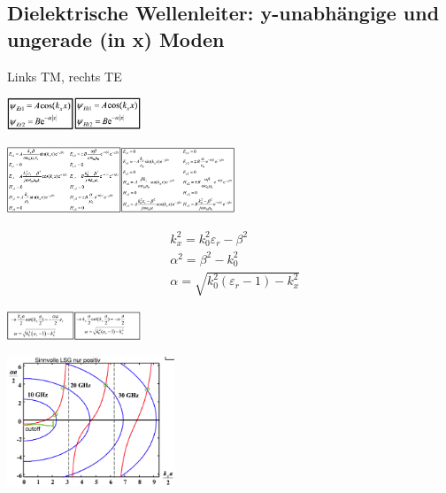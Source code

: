 \documentclass[english]{latex4ei/latex4ei_sheet}
\begin{document}
\begin{sectionbox}
	\subsection{Dielektrische Wellenleiter: y-unabhängige und ungerade (in x) Moden}
	Links TM, rechts TE\\
	\begin{center}\includegraphics[width = 2cm]{./img/dielektr-ugtm.png}\includegraphics[width = 2cm]{./img/dielektr-ugte.png}\end{center}
	\begin{center}\includegraphics[width = 3.4cm]{./img/dielektr-ugtm2.png}\includegraphics[width = 3.4cm]{./img/dielektr-ugte2.png}\end{center}
	$$\begin{aligned}
		&k_{x}^{2}=k_{0}^{2} \varepsilon_{r}-\beta^{2} \\
		&\alpha^{2}=\beta^{2}-k_{0}^{2}\\
		&\alpha=\sqrt{k_{0}^{2}\left(\varepsilon_{r}-1\right)-k_{x}^{2}}
		\end{aligned}$$
	\begin{center}\includegraphics[width = 2cm]{./img/dielektr-ugtm3.png}\includegraphics[width = 2cm]{./img/dielektr-ugte3.png}\end{center}
	\begin{center}\includegraphics[width = 5cm]{./img/dielektr-ug2.png}\end{center}

\end{sectionbox}
\end{document}
